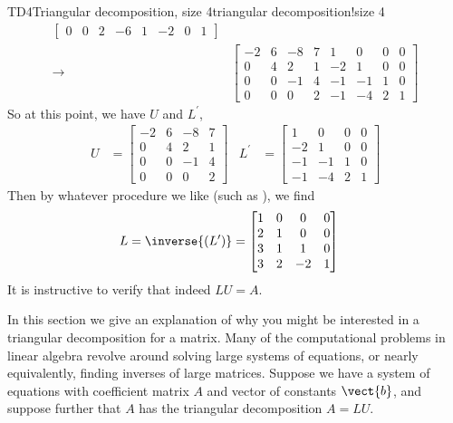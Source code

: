 \begin{example}{TD4}{Triangular decomposition, size 4}{triangular decomposition!size 4}
\begin{align*}
\begin{bmatrix}
 0 & 0 & 2 & -6 & 1 & -2 & 0 & 1
\end{bmatrix}\\
%
\rightarrow&
\begin{bmatrix}
 -2 & 6 & -8 & 7 & 1 & 0 & 0 & 0 \\
 0 & 4 & 2 & 1 & -2 & 1 & 0 & 0 \\
 0 & 0 & -1 & 4 & -1 & -1 & 1 & 0 \\
 0 & 0 & 0 & 2 & -1 & -4 & 2 & 1
\end{bmatrix}
%
\end{align*}
%
So at this point, we have $U$ and $L^\prime$,
%
\begin{align*}
%
U&=
\begin{bmatrix}
 -2 & 6 & -8 & 7 \\
 0 & 4 & 2 & 1 \\
 0 & 0 & -1 & 4  \\
 0 & 0 & 0 & 2 
\end{bmatrix}
&
L^\prime&=
\begin{bmatrix}
 1 & 0 & 0 & 0 \\
 -2 & 1 & 0 & 0 \\
 -1 & -1 & 1 & 0\\
 -1 & -4 & 2 & 1
\end{bmatrix}
%
\end{align*}
%
Then by whatever procedure we like (such as ), we find
%
\begin{align*}
L&=\inverse{\left(L^\prime\right)}=
\begin{bmatrix}
 1 & 0 & 0 & 0 \\
 2 & 1 & 0 & 0 \\
 3 & 1 & 1 & 0 \\
 3 & 2 & -2 & 1
\end{bmatrix}
\end{align*}
%
It is instructive to verify that indeed $LU=A$.
%
\end{example}
%
%
In this section we give an explanation of why you might be interested in a triangular decomposition for a matrix.  Many of the computational problems in linear algebra revolve around solving large systems of equations, or nearly equivalently, finding inverses of large matrices.  Suppose we have a system of equations with coefficient matrix $A$ and vector of constants $\vect{b}$, and suppose further that $A$ has the triangular decomposition $A=LU$.\par
%
